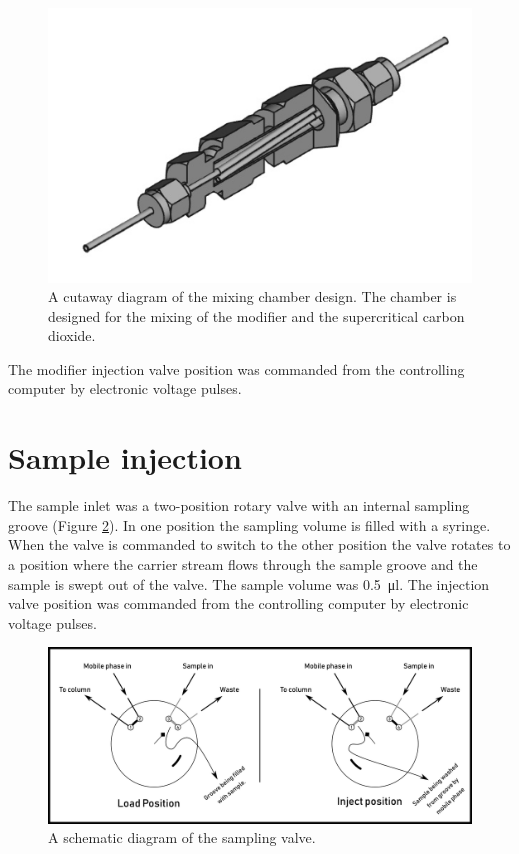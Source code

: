 \begin{figure}
\centering
\includegraphics[width=\textwidth]{Figures/MixingChamber.png}
\decoRule

\caption[A cutaway diagram of the mixing chamber]{A cutaway diagram of the
mixing chamber design. The chamber is designed for the mixing of the modifier
and the supercritical carbon dioxide.}

\label{fig:mixingchamber}
\end{figure}

The modifier injection valve position was commanded from the controlling
computer by electronic voltage pulses.

\section{Sample injection}
\label{sec:SFCInjection}

The sample inlet was a two-position rotary valve with an internal sampling
groove (Figure \ref{fig:samplingvalve}). In one position the sampling volume is
filled with a syringe. When the valve is commanded to switch to the other
position the valve rotates to a position where the carrier stream flows through
the sample groove and the sample is swept out of the valve. The sample volume
was \SI{0.5}{\micro\litre}. The injection valve position was commanded from the
controlling computer by electronic voltage pulses.

\begin{figure}
\centering
\includegraphics[width=\textwidth]{Figures/SampleValve.pdf}
\decoRule

\caption[Schematic diagram of the injection valve.]{A schematic diagram of the sampling valve. }

\label{fig:samplingvalve}
\end{figure}

